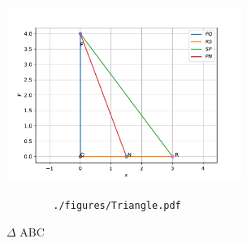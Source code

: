 \begin{enumerate}
		
		\begin{figure}[!htb]
			\centering
			\includegraphics[width=3.0in]{./codes/triangle.pdf}
			\caption{$\Delta$ ABC}
			\label{fig:triangle}
			\begin{lstlisting}
        ./figures/Triangle.pdf
			\end{lstlisting}
		\end{figure}
\end{enumerate}